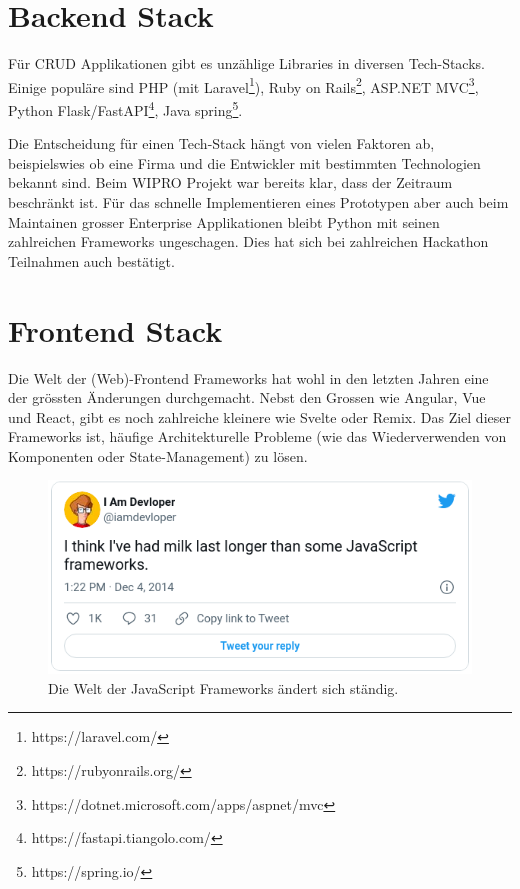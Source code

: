 \section{Backend Stack}

Für \ac{CRUD} Applikationen gibt es unzählige Libraries in diversen Tech-Stacks.
Einige populäre sind PHP (mit Laravel\footnote{https://laravel.com/}),
Ruby on Rails\footnote{https://rubyonrails.org/}, ASP.NET MVC\footnote{https://dotnet.microsoft.com/apps/aspnet/mvc},
Python Flask/FastAPI\footnote{https://fastapi.tiangolo.com/}, Java spring\footnote{https://spring.io/}.

Die Entscheidung für einen Tech-Stack hängt von vielen Faktoren ab, beispielswies
ob eine Firma und die Entwickler mit bestimmten Technologien bekannt sind.
Beim WIPRO Projekt war bereits klar, dass der Zeitraum beschränkt ist.
Für das schnelle Implementieren eines Prototypen aber auch beim Maintainen
grosser Enterprise Applikationen bleibt Python mit seinen zahlreichen
Frameworks ungeschagen. Dies hat sich bei zahlreichen Hackathon Teilnahmen
auch bestätigt.

\section{Frontend Stack}

Die Welt der (Web)-Frontend Frameworks hat wohl in den letzten Jahren eine der grössten Änderungen
durchgemacht. Nebst den Grossen wie Angular, Vue und React, gibt es noch zahlreiche kleinere wie Svelte oder
Remix. Das Ziel dieser Frameworks ist, häufige Architekturelle Probleme (wie das Wiederverwenden von Komponenten
oder State-Management) zu lösen.\cite{do-i-need-a-frontend-fwk}

\begin{figure}[htbp]
    \centering
    \includegraphics{gfx/js-milk}
    \caption{
        Die Welt der JavaScript Frameworks ändert sich ständig.\cite{twitter-js-state}
    }
    \label{fig:frontend-stack}
\end{figure}

